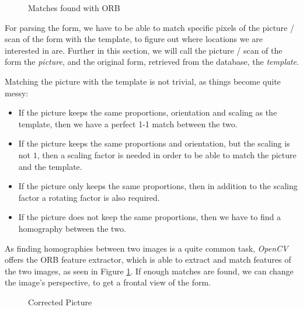\documentclass[12pt, a4paper]{report}
\begin{document}
 \begin{figure}[!h]
     \centering
     \caption{Matches found with ORB}
     \label{orb-matches}
 \end{figure}

For parsing the form, we have to be able to match specific pixels of the picture / scan of the form with the template, to figure out where locations we are interested in are. Further in this section, we will call the picture / scan of the form the \textit{picture}, and the original form, retrieved from the database, the \textit{template}.

Matching the picture with the template is not trivial, as things become quite messy:
\begin{itemize}
    \item If the picture keeps the same proportions, orientation and scaling as the template, then we have a perfect 1-1 match between the two.
    \item If the picture keeps the same proportions and orientation, but the scaling is not $1$, then a scaling factor is needed in order to be able to match the picture and the template.
    \item If the picture only keeps the same proportions, then in addition to the scaling factor a rotating factor is also required.
    \item If the picture does not keep the same proportions, then we have to find a homography between the two.
\end{itemize}

As finding homographies between two images is a quite common task, \textit{OpenCV} offers the ORB feature extractor\cite{rublee2011orb}, which is able to extract and match features of the two images, as seen in Figure \ref{orb-matches}. If enough matches are found, we can change the image's perspective, to get a frontal view of the form.


\begin{figure}[!h]
	\centering
	\caption{Corrected Picture}
	\label{parser-corrected-image}
\end{figure}
\end{document}
